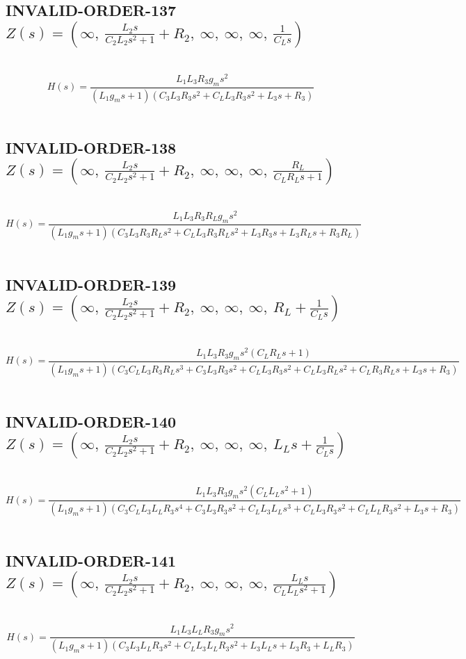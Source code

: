\documentclass{article}
\begin{document}
\subsection{INVALID-ORDER-137 $Z(s) = \left( \infty, \  \frac{L_{2} s}{C_{2} L_{2} s^{2} + 1} + R_{2}, \  \infty, \  \infty, \  \infty, \  \frac{1}{C_{L} s}\right)$ } \ 
\textbf{\[H(s) = \frac{L_{1} L_{3} R_{3} g_{m} s^{2}}{\left(L_{1} g_{m} s + 1\right) \left(C_{3} L_{3} R_{3} s^{2} + C_{L} L_{3} R_{3} s^{2} + L_{3} s + R_{3}\right)}\] } \ 
\subsection{INVALID-ORDER-138 $Z(s) = \left( \infty, \  \frac{L_{2} s}{C_{2} L_{2} s^{2} + 1} + R_{2}, \  \infty, \  \infty, \  \infty, \  \frac{R_{L}}{C_{L} R_{L} s + 1}\right)$ } \ 
\textbf{\[H(s) = \frac{L_{1} L_{3} R_{3} R_{L} g_{m} s^{2}}{\left(L_{1} g_{m} s + 1\right) \left(C_{3} L_{3} R_{3} R_{L} s^{2} + C_{L} L_{3} R_{3} R_{L} s^{2} + L_{3} R_{3} s + L_{3} R_{L} s + R_{3} R_{L}\right)}\] } \ 
\subsection{INVALID-ORDER-139 $Z(s) = \left( \infty, \  \frac{L_{2} s}{C_{2} L_{2} s^{2} + 1} + R_{2}, \  \infty, \  \infty, \  \infty, \  R_{L} + \frac{1}{C_{L} s}\right)$ } \ 
\textbf{\[H(s) = \frac{L_{1} L_{3} R_{3} g_{m} s^{2} \left(C_{L} R_{L} s + 1\right)}{\left(L_{1} g_{m} s + 1\right) \left(C_{3} C_{L} L_{3} R_{3} R_{L} s^{3} + C_{3} L_{3} R_{3} s^{2} + C_{L} L_{3} R_{3} s^{2} + C_{L} L_{3} R_{L} s^{2} + C_{L} R_{3} R_{L} s + L_{3} s + R_{3}\right)}\] } \ 
\subsection{INVALID-ORDER-140 $Z(s) = \left( \infty, \  \frac{L_{2} s}{C_{2} L_{2} s^{2} + 1} + R_{2}, \  \infty, \  \infty, \  \infty, \  L_{L} s + \frac{1}{C_{L} s}\right)$ } \ 
\textbf{\[H(s) = \frac{L_{1} L_{3} R_{3} g_{m} s^{2} \left(C_{L} L_{L} s^{2} + 1\right)}{\left(L_{1} g_{m} s + 1\right) \left(C_{3} C_{L} L_{3} L_{L} R_{3} s^{4} + C_{3} L_{3} R_{3} s^{2} + C_{L} L_{3} L_{L} s^{3} + C_{L} L_{3} R_{3} s^{2} + C_{L} L_{L} R_{3} s^{2} + L_{3} s + R_{3}\right)}\] } \ 
\subsection{INVALID-ORDER-141 $Z(s) = \left( \infty, \  \frac{L_{2} s}{C_{2} L_{2} s^{2} + 1} + R_{2}, \  \infty, \  \infty, \  \infty, \  \frac{L_{L} s}{C_{L} L_{L} s^{2} + 1}\right)$ } \ 
\textbf{\[H(s) = \frac{L_{1} L_{3} L_{L} R_{3} g_{m} s^{2}}{\left(L_{1} g_{m} s + 1\right) \left(C_{3} L_{3} L_{L} R_{3} s^{2} + C_{L} L_{3} L_{L} R_{3} s^{2} + L_{3} L_{L} s + L_{3} R_{3} + L_{L} R_{3}\right)}\] } \ 
\end{document}
